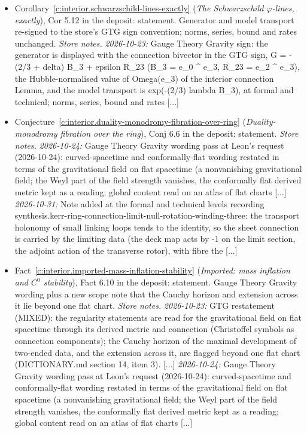 \documentclass[11pt]{article}
\theoremstyle{definition}
\theoremstyle{plain}
\begin{document}
\begin{itemize}
\item Corollary~\ref{c:interior.schwarzschild-lines-exactly} (\emph{The Schwarzschild $\varphi$-lines, exactly}), Cor 5.12 in the deposit: statement. Generator and model transport re-signed to the store's GTG sign convention; norms, series, bound and rates unchanged. \emph{Store notes.} \emph{2026-10-23:} Gauge Theory Gravity sign: the generator is displayed with the connection bivector in the GTG sign, G = -(2/3 + delta) B\_3 + epsilon R\_23 (B\_3 = e\_0 \^{} e\_3, R\_23 = e\_2 \^{} e\_3), the Hubble-normalised value of Omega(e\_3) of the interior connection Lemma, and the model transport is exp(-(2/3) lambda B\_3), at formal and technical; norms, series, bound and rates [...]
\item Conjecture~\ref{c:interior.duality-monodromy-fibration-over-ring} (\emph{Duality-monodromy fibration over the ring}), Conj 6.6 in the deposit: statement. \emph{Store notes.} \emph{2026-10-24:} Gauge Theory Gravity wording pass at Leon's request (2026-10-24): curved-spacetime and conformally-flat wording restated in terms of the gravitational field on flat spacetime (a nonvanishing gravitational field; the Weyl part of the field strength vanishes, the conformally flat derived metric kept as a reading; global content read on an atlas of flat charts [...] \emph{2026-10-31:} Note added at the formal and technical levels recording synthesis.kerr-ring-connection-limit-null-rotation-winding-three: the transport holonomy of small linking loops tends to the identity, so the sheet connection is carried by the limiting data (the deck map acts by -1 on the limit section, the adjoint action of the transverse rotor), with fibre the [...]
\item Fact~\ref{c:interior.imported-mass-inflation-stability} (\emph{Imported: mass inflation and $C^0$ stability}), Fact 6.10 in the deposit: statement. Gauge Theory Gravity wording plus a new scope note that the Cauchy horizon and extension across it lie beyond one flat chart. \emph{Store notes.} \emph{2026-10-23:} GTG restatement (MIXED): the regularity statements are read for the gravitational field on flat spacetime through its derived metric and connection (Christoffel symbols as connection components); the Cauchy horizon of the maximal development of two-ended data, and the extension across it, are flagged beyond one flat chart (DICTIONARY.md section 14, item 3). [...] \emph{2026-10-24:} Gauge Theory Gravity wording pass at Leon's request (2026-10-24): curved-spacetime and conformally-flat wording restated in terms of the gravitational field on flat spacetime (a nonvanishing gravitational field; the Weyl part of the field strength vanishes, the conformally flat derived metric kept as a reading; global content read on an atlas of flat charts [...]

\end{itemize}
\end{document}
